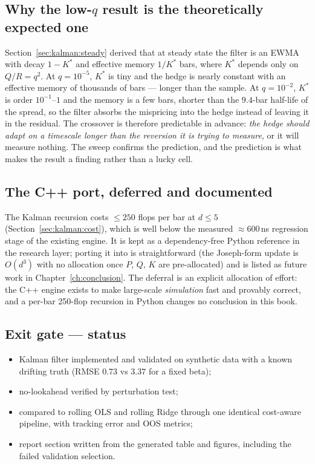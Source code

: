 \subsection{Why the low-$q$ result is the theoretically expected one}

Section~\ref{sec:kalman:steady} derived that at steady state the filter is an EWMA with
decay $1-K^\ast$ and effective memory $1/K^\ast$ bars, where $K^\ast$ depends only on
$Q/R=q^2$. At $q=10^{-5}$, $K^\ast$ is tiny and the hedge is nearly constant with an
effective memory of thousands of bars --- longer than the sample. At $q=10^{-2}$, $K^\ast$
is order $10^{-1}$--$1$ and the memory is a few bars, shorter than the $9.4$-bar half-life
of the spread, so the filter absorbs the mispricing into the hedge instead of leaving it
in the residual. The crossover is therefore predictable in advance: \emph{the hedge should
adapt on a timescale longer than the reversion it is trying to measure}, or it will
measure nothing. The sweep confirms the prediction, and the prediction is what makes the
result a finding rather than a lucky cell.

\subsection{The C++ port, deferred and documented}

The Kalman recursion costs $\le250$ flops per bar at $d\le5$ (Section~\ref{sec:kalman:cost}),
which is well below the measured $\approx600$\,ns regression stage of the existing engine.
It is kept as a dependency-free Python reference in the research layer; porting it into
 is straightforward (the Joseph-form update is $O(d^3)$ with no
allocation once $P$, $Q$, $K$ are pre-allocated) and is listed as future work in
Chapter~\ref{ch:conclusion}. The deferral is an explicit allocation of effort: the C++ engine
exists to make large-scale \emph{simulation} fast and provably correct, and a per-bar
250-flop recursion in Python changes no conclusion in this book.

\subsection{Exit gate --- status}

\begin{itemize}
  \item[\checkmark] Kalman filter implemented and validated on synthetic data with a known
    drifting truth (RMSE $0.73$ vs $3.37$ for a fixed beta);
  \item[\checkmark] no-lookahead verified by perturbation test;
  \item[\checkmark] compared to rolling OLS and rolling Ridge through one identical
    cost-aware pipeline, with tracking error and OOS metrics;
  \item[\checkmark] report section written from the generated table and figures, including
    the failed validation selection.
\end{itemize}
